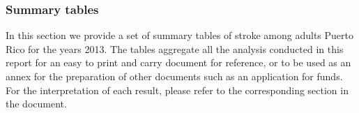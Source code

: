 \newpage
\subsubsection{Summary tables}
In this section we provide a set of summary tables of stroke among adults Puerto Rico for the years 2013. The tables aggregate all the analysis conducted in this report for an easy to print and carry document for reference, or to be used as an annex for the preparation of other documents such as an application for funds. For the interpretation of each result, please refer to the corresponding section in the document.

 
